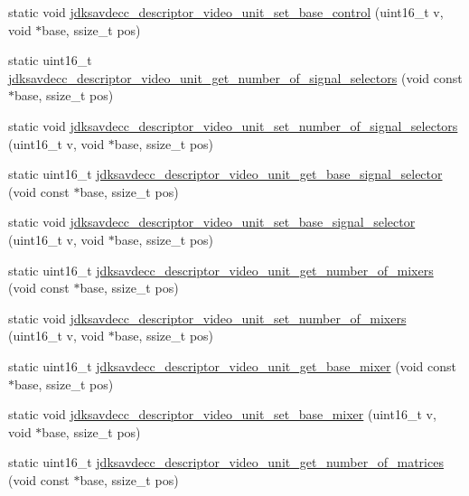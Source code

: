 \begin{DoxyCompactItemize}
\item 
static void \hyperlink{group__descriptor__video_gaa89ae6165083b03489a41d45b46b31f6}{jdksavdecc\+\_\+descriptor\+\_\+video\+\_\+unit\+\_\+set\+\_\+base\+\_\+control} (uint16\+\_\+t v, void $\ast$base, ssize\+\_\+t pos)
\item 
static uint16\+\_\+t \hyperlink{group__descriptor__video_ga8ea7f53c6d7e10ced5817ff9b8737229}{jdksavdecc\+\_\+descriptor\+\_\+video\+\_\+unit\+\_\+get\+\_\+number\+\_\+of\+\_\+signal\+\_\+selectors} (void const $\ast$base, ssize\+\_\+t pos)
\item 
static void \hyperlink{group__descriptor__video_ga0d8fc591be9f06ba5718345ce0dbb718}{jdksavdecc\+\_\+descriptor\+\_\+video\+\_\+unit\+\_\+set\+\_\+number\+\_\+of\+\_\+signal\+\_\+selectors} (uint16\+\_\+t v, void $\ast$base, ssize\+\_\+t pos)
\item 
static uint16\+\_\+t \hyperlink{group__descriptor__video_gaa9aff78be73fafa61f37b5b23f880d9c}{jdksavdecc\+\_\+descriptor\+\_\+video\+\_\+unit\+\_\+get\+\_\+base\+\_\+signal\+\_\+selector} (void const $\ast$base, ssize\+\_\+t pos)
\item 
static void \hyperlink{group__descriptor__video_ga79808fe9208b55f021685d15f68aa637}{jdksavdecc\+\_\+descriptor\+\_\+video\+\_\+unit\+\_\+set\+\_\+base\+\_\+signal\+\_\+selector} (uint16\+\_\+t v, void $\ast$base, ssize\+\_\+t pos)
\item 
static uint16\+\_\+t \hyperlink{group__descriptor__video_ga484b68e2f5a5e3dae2462c19b7f7e4e3}{jdksavdecc\+\_\+descriptor\+\_\+video\+\_\+unit\+\_\+get\+\_\+number\+\_\+of\+\_\+mixers} (void const $\ast$base, ssize\+\_\+t pos)
\item 
static void \hyperlink{group__descriptor__video_ga9e304726044e3fc3bdc586592e756ab6}{jdksavdecc\+\_\+descriptor\+\_\+video\+\_\+unit\+\_\+set\+\_\+number\+\_\+of\+\_\+mixers} (uint16\+\_\+t v, void $\ast$base, ssize\+\_\+t pos)
\item 
static uint16\+\_\+t \hyperlink{group__descriptor__video_ga54cdb2a4eb705488e57df90224925e3b}{jdksavdecc\+\_\+descriptor\+\_\+video\+\_\+unit\+\_\+get\+\_\+base\+\_\+mixer} (void const $\ast$base, ssize\+\_\+t pos)
\item 
static void \hyperlink{group__descriptor__video_ga81231bc2fa0ae453cd4dfb698fefe675}{jdksavdecc\+\_\+descriptor\+\_\+video\+\_\+unit\+\_\+set\+\_\+base\+\_\+mixer} (uint16\+\_\+t v, void $\ast$base, ssize\+\_\+t pos)
\item 
static uint16\+\_\+t \hyperlink{group__descriptor__video_gaf69b40cfb6a4e25a4f7bc63feab589aa}{jdksavdecc\+\_\+descriptor\+\_\+video\+\_\+unit\+\_\+get\+\_\+number\+\_\+of\+\_\+matrices} (void const $\ast$base, ssize\+\_\+t pos)

\end{DoxyCompactItemize}
